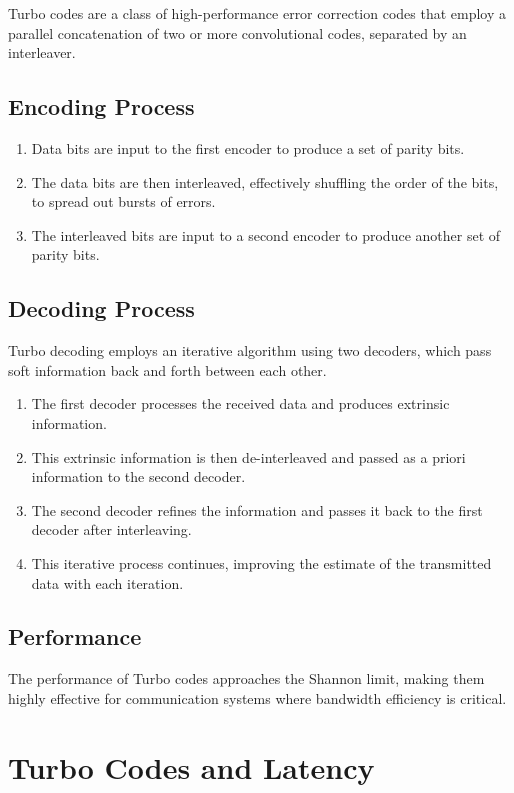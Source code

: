 Turbo codes are a class of high-performance error correction codes that employ a parallel concatenation of two or more convolutional codes, separated by an interleaver.

\subsection*{Encoding Process}
\begin{enumerate}
    \item Data bits are input to the first encoder to produce a set of parity bits.
    \item The data bits are then interleaved, effectively shuffling the order of the bits, to spread out bursts of errors.
    \item The interleaved bits are input to a second encoder to produce another set of parity bits.
\end{enumerate}

\subsection*{Decoding Process}
Turbo decoding employs an iterative algorithm using two decoders, which pass soft information back and forth between each other.

\begin{enumerate}
    \item The first decoder processes the received data and produces extrinsic information.
    \item This extrinsic information is then de-interleaved and passed as a priori information to the second decoder.
    \item The second decoder refines the information and passes it back to the first decoder after interleaving.
    \item This iterative process continues, improving the estimate of the transmitted data with each iteration.
\end{enumerate}

\subsection*{Performance}
The performance of Turbo codes approaches the Shannon limit, making them highly effective for communication systems where bandwidth efficiency is critical.




\section*{Turbo Codes and Latency}

